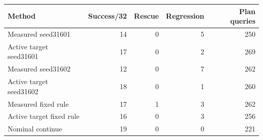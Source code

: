 \begin{tabular}{lrrrr}
\hline
Method & Success/32 & Rescue & Regression & Plan queries \\
\hline
Measured seed31601 & 14 & 0 & 5 & 250 \\
Active target seed31601 & 17 & 0 & 2 & 269 \\
Measured seed31602 & 12 & 0 & 7 & 262 \\
Active target seed31602 & 18 & 0 & 1 & 260 \\
Measured fixed rule & 17 & 1 & 3 & 262 \\
Active target fixed rule & 16 & 0 & 3 & 256 \\
Nominal continue & 19 & 0 & 0 & 221 \\
\hline
\end{tabular}
